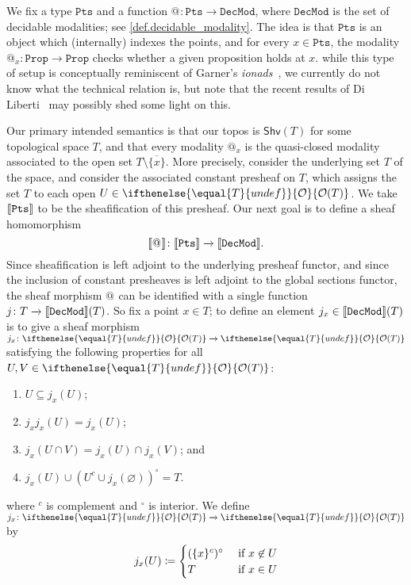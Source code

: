 \documentclass[reqno,11pt]{amsproc}
\makeatletter
\theoremstyle{plain}
\theoremstyle{definition}
\DeclarePairedDelimiter{\church}{\llbracket}{\rrbracket}
\newcommand{\Const}[1]{\mathtt{#1}}
\newcommand{\cat}[1]{\mathsf{#1}}
\renewcommand{\to}[1][]{\xrightarrow{#1}}
\newcommand{\tn}[1]{\textnormal{#1}}
\newcommand{\shv}{\cat{Shv}}
\newcommand{\prop}{\Const{Prop}}
\newcommand{\pt}{x}
\newcommand{\Op}[1][undef]{\ifthenelse{\equal{#1}{undef}}{\mathcal{O}}{\mathcal{O}(#1)}}
\newcommand{\pts}{\mathtt{Pts}}		%
\newcommand{\decmod}{\mathtt{DecMod}}	%
\newcommand{\atsymbol}{{@}}
\newcommand{\at}[1][\pt]{\atsymbol_{#1}}
\numberwithin{equation}{section}
\makeatother
\begin{document}
We fix a type $\pts$ and a function $\at[]\colon\pts\to\decmod$, where $\decmod$ is the set of decidable modalities; see \cref{def.decidable_modality}. The idea is that $\pts$ is an object which (internally) indexes the points, and for every $\pt \in \pts$, the modality $\at : \prop \to \prop$ checks whether a given proposition holds at $\pt$. 
while this type of setup is conceptually reminiscent of Garner's \emph{ionads}~\cite{garner2012ionads}, we currently do not know what the technical relation is, but note that the recent results of Di Liberti~\cite{diliberti2020topology} may possibly shed some light on this.

Our primary intended semantics is that our topos is $\shv(T)$ for some topological space $T$, and that every modality $\at$ is the quasi-closed modality associated to the open set $T \setminus \overline{\{\pt\}}$. More precisely, consider the underlying set $T$ of the space, and consider the associated constant presheaf on $T$, which assigns the set $T$ to each open $U\in\Op[T]$. We take $\church{\pts}$ to be the sheafification of this presheaf. Our next goal is to define a sheaf homomorphism
\begin{equation}\label{eqn.at_semantics}
	\church{\at[]}\colon\church{\pts}\to\church{\decmod}.
\end{equation}
Since sheafification is left adjoint to the underlying presheaf functor, and since the inclusion of constant presheaves is left adjoint to the global sections functor, the sheaf morphism $\at[]$ can be identified with a single function $j\colon T\to\church{\decmod}(T)$. So fix a point $\pt\in T$;
to define an element $j_\pt\in\church{\decmod}(T)$ is to give a sheaf morphism $j_\pt\colon\Op[T]\to\Op[T]$ satisfying the following properties for all $U,V\in\Op[T]$:
\begin{enumerate}
	\item\label{j_increasing} $U\subseteq j_\pt(U)$;
	\item\label{j_idempotent} $j_\pt j_\pt(U)=j_\pt(U)$;
	\item\label{j_meets} $j_\pt(U\cap V)=j_\pt(U)\cap j_\pt(V)$; and
	\item\label{j_decidable} $j_\pt(U)\cup (U^c\cup j_\pt(\varnothing))^\circ=T$.
\end{enumerate}
where $^c$ is complement and $^\circ$ is interior. We define $j_\pt\colon\Op[T]\to\Op[T]$ by
\begin{equation}\label{eqn.j_k}
	j_\pt(U)\coloneqq
	\begin{cases}
		(\{\pt\}^c)^\circ&\tn{ if }\pt\not\in U\\
		T&\tn{ if } \pt\in U
	\end{cases}
\end{equation}
\end{document}
